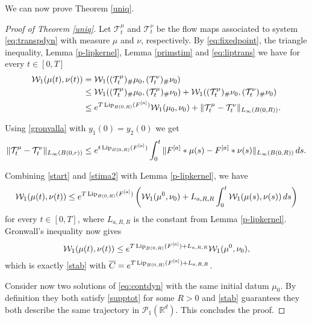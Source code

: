 \documentclass[A4paper,11pt]{article}
\theoremstyle{definition}
\newcommand{\Lip}{\textup{Lip}}
\newcommand{\R}{\mathbb{R}}
\newcommand{\W}{\mathcal{W}}
\newcommand{\PP}{\mathcal{P}_1}
\newcommand{\Fun}[1]{F^{[#1]}}
\begin{document}
We can now prove Theorem \ref{uniq}.

\begin{proof}[Proof of Theorem \ref{uniq}]
Let  ${\mathcal T}^\mu_t$ and ${\mathcal T}^\nu_t$ be the flow maps associated to system \eqref{eq:transpdyn} with measure $\mu$ and $\nu$, respectively.
By \eqref{eq:fixedpoint}, the triangle inequality, Lemma \ref{p-lipkernel}, Lemma \ref{primstim} and \eqref{eq:liptrans} we have for every $t \in [0,T]$
\begin{align}
\begin{split}\label{start}
\W_1(\mu(t), \nu(t))&=\W_1(({\mathcal T}^\mu_t)_{\#} \mu_0, ({\mathcal T}^\nu_t)_{\#} \nu_0)  \\
&\le \W_1(({\mathcal T}^\mu_t)_{\#} \mu_0, ({\mathcal T}^\mu_t)_{\#} \nu_0) + \W_1(({\mathcal T}^\mu_t)_{\#} \nu_0, ({\mathcal T}^\nu_t)_{\#} \nu_0)\\
&\le e^{T \, \Lip_{B(0,R)}(\Fun{a})} \W_1(\mu_0, \nu_0)+\|{\mathcal T}^\mu_t-{\mathcal T}^\nu_t\|_{L_\infty(B(0,R))}.
\end{split}
\end{align}

Using \eqref{gronvalla} with $y_1(0)= y_2(0)$ we get
\begin{equation}\label{stima2}
\|{\mathcal T}^\mu_t-{\mathcal T}^\nu_t\|_{L_\infty(B(0,r))}\le e^{t \, \Lip_{B(0,R)}(\Fun{a})}\int_0^t \|\Fun{a}* \mu(s)-\Fun{a}* \nu(s)\|_{L_\infty(B(0,R))}\,ds.
\end{equation}

Combining \eqref{start} and \eqref{stima2} with Lemma \ref{p-lipkernel}, we have
$$
\W_1(\mu(t), \nu(t))\le e^{T \, \Lip_{B(0,R)}(\Fun{a})} \left(\W_1(\mu^0, \nu_0)+ L_{a,R,R}\int_0^t \W_1(\mu(s), \nu(s)) \,ds\right)
$$
for every $t \in [0, T]$, where $L_{a,R,R}$ is the constant from Lemma \ref{p-lipkernel}. Gronwall's inequality now gives
$$
\W_1(\mu(t), \nu(t))\le e^{T \, \Lip_{B(0,R)}(\Fun{a}) + L_{a,R,R}} \W_1(\mu^0, \nu_0),
$$
which is exactly \eqref{stab} with $\overline{C}= e^{T \, \Lip_{B(0,R)}(\Fun{a}) + L_{a,R,R}}$.

Consider now two solutions of \eqref{eq:contdyn} with the same initial datum $\mu_0$.  By definition they both satisfy \eqref{supptot} for some $R>0 $ and \eqref{stab} guarantees they both describe the same trajectory in $\PP(\R^d)$. This concludes the proof.
\end{proof}


	
\end{document}
